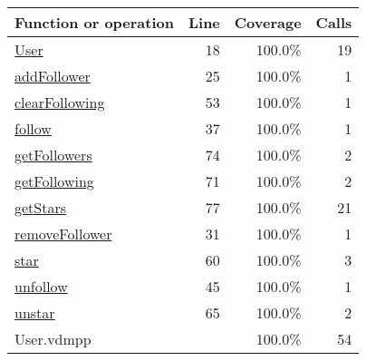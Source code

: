 \bigskip
\begin{longtable}{|l|r|r|r|}
\hline
Function or operation & Line & Coverage & Calls \\
\hline
\hline
\hyperref[User:18]{User} & 18&100.0\% & 19 \\
\hline
\hyperref[addFollower:25]{addFollower} & 25&100.0\% & 1 \\
\hline
\hyperref[clearFollowing:53]{clearFollowing} & 53&100.0\% & 1 \\
\hline
\hyperref[follow:37]{follow} & 37&100.0\% & 1 \\
\hline
\hyperref[getFollowers:74]{getFollowers} & 74&100.0\% & 2 \\
\hline
\hyperref[getFollowing:71]{getFollowing} & 71&100.0\% & 2 \\
\hline
\hyperref[getStars:77]{getStars} & 77&100.0\% & 21 \\
\hline
\hyperref[removeFollower:31]{removeFollower} & 31&100.0\% & 1 \\
\hline
\hyperref[star:60]{star} & 60&100.0\% & 3 \\
\hline
\hyperref[unfollow:45]{unfollow} & 45&100.0\% & 1 \\
\hline
\hyperref[unstar:65]{unstar} & 65&100.0\% & 2 \\
\hline
\hline
User.vdmpp & & 100.0\% & 54 \\
\hline
\end{longtable}

